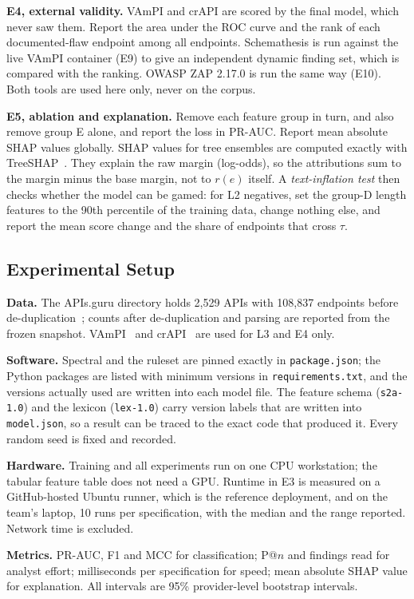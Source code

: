 \documentclass[conference]{IEEEtran}
\begin{document}
\textbf{E4, external validity.} VAmPI and crAPI are scored by the final model, which never saw
them. Report the area under the ROC curve and the rank of each documented-flaw endpoint among
all endpoints. Schemathesis is run against the live VAmPI container (E9) to give an
independent dynamic finding set, which is compared with the ranking. OWASP ZAP 2.17.0 is run the same way (E10).
Both tools are used here only, never on the corpus.

\textbf{E5, ablation and explanation.} Remove each feature group in turn, and also remove
group E alone, and report the loss in PR-AUC. Report mean absolute SHAP values globally.
SHAP values for tree ensembles are computed exactly with TreeSHAP~\cite{treeshap}. They explain the raw
margin (log-odds), so the attributions sum to the margin minus the base margin, not to $r(e)$
itself. A \emph{text-inflation test} then checks whether the model can be gamed: for L2
negatives, set the group-D length features to the 90th percentile of the training data, change
nothing else, and report the mean score change and the share of endpoints that cross $\tau$.

\subsection{Experimental Setup}
\textbf{Data.} The APIs.guru directory holds 2{,}529 APIs with 108{,}837 endpoints before
de-duplication~\cite{apisguru}; counts after de-duplication and parsing are reported from the
frozen snapshot. VAmPI~\cite{vampi} and crAPI~\cite{crapi} are used for L3 and E4 only.

\textbf{Software.} Spectral and the ruleset are pinned exactly in \texttt{package.json}; the Python packages are listed with minimum versions in \texttt{requirements.txt}, and the versions actually used are written into each model file.
The feature schema (\texttt{s2a-1.0}) and the lexicon (\texttt{lex-1.0}) carry version labels
that are written into \texttt{model.json}, so a result can be traced to the exact code that
produced it. Every random seed is fixed and recorded.

\textbf{Hardware.} Training and all experiments run on one CPU workstation; the tabular
feature table does not need a GPU. Runtime in E3 is measured on a GitHub-hosted Ubuntu runner,
which is the reference deployment, and on the team's laptop, 10 runs per specification, with
the median and the range reported. Network time is excluded.

\textbf{Metrics.} PR-AUC, F1 and MCC for classification; P@$n$ and findings read
for analyst effort; milliseconds per specification for speed; mean absolute SHAP value for
explanation. All intervals are 95\% provider-level bootstrap intervals.
\end{document}
